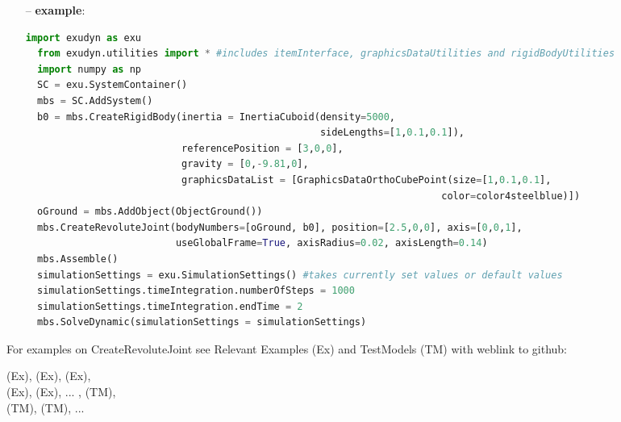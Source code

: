 \begin{itemize}[leftmargin=0.7cm]
\item[--]
{\bf example}: \vspace{-12pt}\ei\begin{lstlisting}[language=Python, xleftmargin=36pt]
  import exudyn as exu
  from exudyn.utilities import * #includes itemInterface, graphicsDataUtilities and rigidBodyUtilities
  import numpy as np
  SC = exu.SystemContainer()
  mbs = SC.AddSystem()
  b0 = mbs.CreateRigidBody(inertia = InertiaCuboid(density=5000,
                                                   sideLengths=[1,0.1,0.1]),
                           referencePosition = [3,0,0],
                           gravity = [0,-9.81,0],
                           graphicsDataList = [GraphicsDataOrthoCubePoint(size=[1,0.1,0.1],
                                                                        color=color4steelblue)])
  oGround = mbs.AddObject(ObjectGround())
  mbs.CreateRevoluteJoint(bodyNumbers=[oGround, b0], position=[2.5,0,0], axis=[0,0,1],
                          useGlobalFrame=True, axisRadius=0.02, axisLength=0.14)
  mbs.Assemble()
  simulationSettings = exu.SimulationSettings() #takes currently set values or default values
  simulationSettings.timeIntegration.numberOfSteps = 1000
  simulationSettings.timeIntegration.endTime = 2
  mbs.SolveDynamic(simulationSettings = simulationSettings)
\end{lstlisting}\vspace{-24pt}\bi\item[]\vspace{-24pt}\vspace{12pt}\end{itemize}
%

%
\noindent For examples on CreateRevoluteJoint see Relevant Examples (Ex) and TestModels (TM) with weblink to github:
\bi
 \item \footnotesize {} (Ex), 
 (Ex), 
 (Ex), 
\\  (Ex), 
 (Ex), 
 ...
, 
 (TM), 
\\  (TM), 
 (TM), 
 ...

